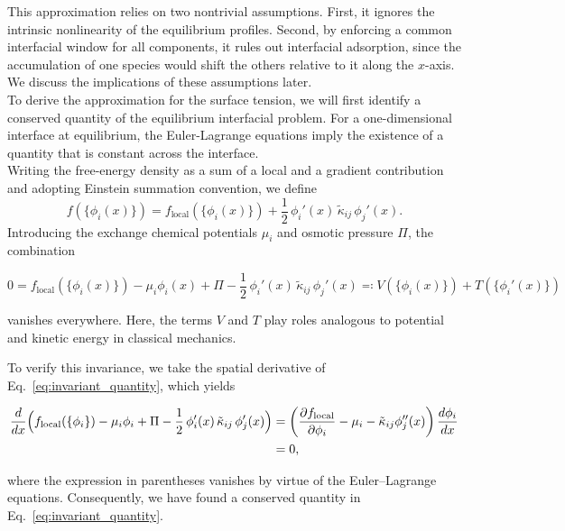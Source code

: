 \documentclass[12pt]{article}
\begin{document}
This approximation relies on two nontrivial assumptions. First, it ignores the intrinsic nonlinearity of the equilibrium profiles.
Second, by enforcing a common interfacial window for all components, it rules out interfacial adsorption, since the accumulation of one species would shift the others relative to it along the $x$-axis.
We discuss the implications of these assumptions later.\\
To derive the approximation for the surface tension, we will
first identify a conserved quantity of the equilibrium interfacial problem. For a
one-dimensional interface at equilibrium, the Euler-Lagrange equations imply the
existence of a quantity that is constant across the interface.\\
Writing the free-energy density as a sum of a local and a gradient
contribution and adopting Einstein summation convention, we define
\begin{equation}
    f(\{\phi_i(x)\})
    = f_{\mathrm{local}}(\{\phi_i(x)\})
    + \frac{1}{2}\, \phi_i'(x)\,\tilde\kappa_{ij}\, \phi_j'(x).
\end{equation}
Introducing the exchange chemical potentials $\mu_i$ and osmotic pressure $\Pi$, the
combination

\begin{equation}
    0=f_{\mathrm{local}}(\{\phi_i(x)\})
    - \mu_i \phi_i(x)
    + \Pi
    - \frac{1}{2}\, \phi_i'(x)\,\tilde\kappa_{ij}\, \phi_j'(x)
    \eqcolon V(\{\phi_i(x)\}) + T(\{ \phi_i'(x)\})
    \label{eq:invariant_quantity}
\end{equation}

vanishes everywhere. Here, the terms $V$ and $T$ play roles analogous
to potential and kinetic energy in classical mechanics.

To verify this invariance, we take the spatial derivative of Eq.~\eqref{eq:invariant_quantity}, which yields

\[
\begin{aligned}
    \frac{d}{dx} \Bigl(
    f_{\mathrm{local}}(\{\phi_i\})
    - \mu_i \phi_i
    + \Pi
    - \frac{1}{2}\, \phi_i'(x)\,\tilde\kappa_{ij}\, \phi_j'(x)
    \Bigr)
    &=
    \left(
    \frac{\partial f_{\mathrm{local}}}{\partial \phi_i}
    - \mu_i
    - \tilde\kappa_{ij}  \phi_j''(x)
    \right)
    \frac{d\phi_i}{dx} \\
    &= 0,
\end{aligned}
\]

where the expression in parentheses vanishes by virtue of the Euler–Lagrange
equations. Consequently, we have found a conserved quantity in Eq.~\eqref{eq:invariant_quantity}.\\
\end{document}
